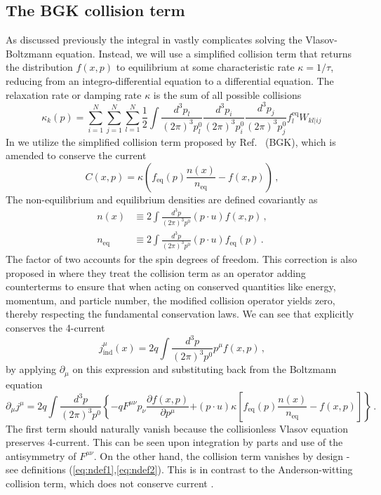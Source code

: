 \subsection{The BGK collision term}
As discussed previously the integral in  vastly complicates solving the Vlasov-Boltzmann equation. Instead, we will use a simplified collision term that returns the distribution $f(x,p)$ to equilibrium at some characteristic rate $\kappa = 1/\tau$, reducing  from an integro-differential equation to a differential equation. The relaxation rate or damping rate $\kappa$ is the sum of all possible collisions~\cite{Das:2021bkz}
\begin{equation}
    \kappa_k(p) = \sum^N_{i=1}\sum^N_{j=1}\sum^N_{l=1} \frac{1}{2}\int\frac{d^3p_l}{(2 \pi)^3p_l^0}\frac{d^3p_i}{(2 \pi)^3p_i^0}\frac{d^3p_j}{(2 \pi)^3p_j^0}f_l^{\text{eq}}W_{kl|ij}\,
\end{equation}
In \cite{Formanek:2021blc} we utilize the simplified collision term proposed by Ref.~\cite{Bhatnagar:1954zz} (BGK), which is amended to conserve the current 
\begin{equation}\label{eq:collision}
    \boxed{C(x,p) =\kappa\left(f_{\text{eq}}(p)\frac{n(x)}{{n_{\text{eq}}}} - f(x,p)\right)}\,,
\end{equation}
The non-equilibrium and equilibrium densities are defined covariantly as
\begin{align}
\label{eq:ndef1}n(x) &\equiv 2 \int \frac{d^3p}{(2\pi)^3p^0}(p \cdot u)f(x,p)\,,\\
\label{eq:ndef2}n_\mathrm{eq} &\equiv 2\int \frac{d^3p}{(2\pi)^3p^0}(p \cdot u) f_\mathrm{eq}(p)\,.
\end{align}
The factor of two accounts for the spin degrees of freedom. This correction is also proposed in \cite{Rocha:2021zcw} where they treat the collision term as an operator adding counterterms to ensure that when acting on conserved quantities like energy, momentum, and particle number, the modified collision operator yields zero, thereby respecting the fundamental conservation laws. We can see that  explicitly conserves the 4-current~\cite{Formanek:2021blc}
\begin{equation}\label{eq:jmudef}
j_{\mathrm{ind}}^\mu (x)= 2q \int \frac{d^3p}{(2\pi)^3p^0}p^\mu f(x,p)\,,
\end{equation}
by applying $\partial_\mu$ on this expression and substituting back from the Boltzmann equation 
\begin{equation}
\partial_\mu j^\mu = 2q \int \frac{d^3p}{(2\pi)^3p^0} \left\{-q F^{\mu\nu}p_\nu \frac{\partial f(x,p)}{\partial p^\mu}\right. 
\left. + (p \cdot u)\kappa \left[f_\mathrm{eq}(p) \frac{n(x)}{n_\mathrm{eq}}-f(x,p) \right] \right\}\,.
\end{equation} 
The first term should naturally vanish because the collisionless Vlasov equation preserves 4-current. This can be seen upon integration by parts and use of the antisymmetry of $F^{\mu\nu}$. On the other hand, the collision term vanishes by design - see definitions (\ref{eq:ndef1},\ref{eq:ndef2}). This is in contrast to the Anderson-witting collision term, which does not conserve current .


